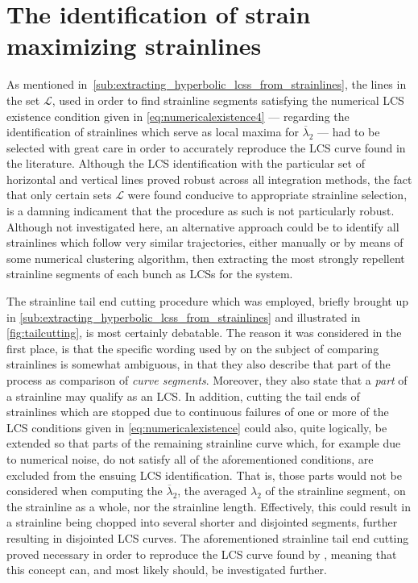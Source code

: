 \section{The identification of strain maximizing strainlines}
\label{sec:the_identification_of_strain_maximizing_strainlines}

As mentioned in~\cref{sub:extracting_hyperbolic_lcss_from_strainlines},
the lines in the set $\mathcal{L}$, used in order to find strainline segments
satisfying the numerical LCS existence condition given in
\cref{eq:numericalexistence4} --- regarding the identification of strainlines
which serve as local maxima for $\overline{\lambda}_{2}$ --- had to be selected
with great care in order to accurately reproduce the LCS curve found in the
literature. Although the LCS identification with the particular set of
horizontal and vertical lines proved robust across all integration methods, the
fact that only certain sets $\mathcal{L}$ were found conducive to appropriate
strainline selection, is a damning indicament that the procedure as such is not
particularly robust. Although not investigated here, an alternative approach
could be to identify all strainlines which follow very similar trajectories,
either manually or by means of some numerical clustering algorithm, then
extracting the most strongly repellent strainline segments of each bunch as
LCSs for the system.

The strainline tail end cutting procedure which was employed, briefly brought
up in
\cref{sub:extracting_hyperbolic_lcss_from_strainlines} and illustrated in
\cref{fig:tailcutting}, is most certainly debatable. The reason it was
considered in the first place, is that the specific wording used by
\textcite{farazmand2012computing} on the subject of comparing strainlines is
somewhat ambiguous, in that they also describe that part of the process as
comparison of \emph{curve segments}. Moreover, they also state that a
\emph{part} of a strainline may qualify as an LCS. In addition, cutting the
tail ends of strainlines which are stopped due to continuous failures of one
or more of the LCS conditions given in
\cref{eq:numericalexistence} could also, quite logically, be extended so that
parts of the remaining strainline curve which, for example due to numerical
noise, do not satisfy all of the aforementioned conditions, are excluded from
the ensuing LCS identification. That is, those parts would not be considered
when computing the $\overline{\lambda}_{2}$, the averaged $\lambda_{2}$ of
the strainline segment, on the strainline as a whole, nor
the strainline length. Effectively, this could result in a strainline being
chopped into several shorter and disjointed segments, further resulting in
disjointed LCS curves. The aforementioned strainline tail end cutting proved
necessary in order to reproduce the LCS curve found by
\textcite{farazmand2012computing}, meaning that this concept can, and most
likely should, be investigated further.

